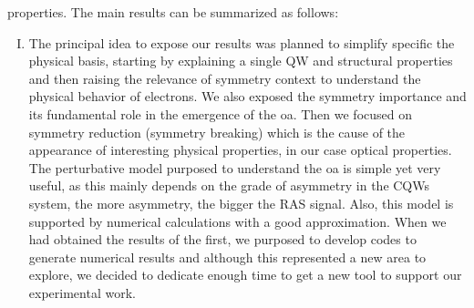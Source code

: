 properties. The main results can be summarized as follows:
\begin{enumerate}[I)]

\item The principal idea to expose our results was planned to simplify specific the physical basis, starting by explaining a single \gls{QW} and structural properties and then raising the relevance of symmetry context to understand the physical behavior of electrons. We also exposed the symmetry importance and its fundamental
role in the emergence of the \gls{oa}. Then we focused on symmetry reduction (symmetry breaking) which is the cause of the appearance of interesting physical properties, in our case optical properties. The perturbative model purposed to understand the \gls{oa} is simple yet very useful, as this mainly depends on the grade of asymmetry in the \gls{CQWs} system, the more asymmetry, the bigger the RAS signal. Also, this model is supported by numerical calculations with a good approximation. When we had obtained the results of the first, we purposed to develop codes to generate numerical results and although this represented a new area to explore, we decided to dedicate enough time to get a new tool to support our experimental work.

\end{enumerate}
